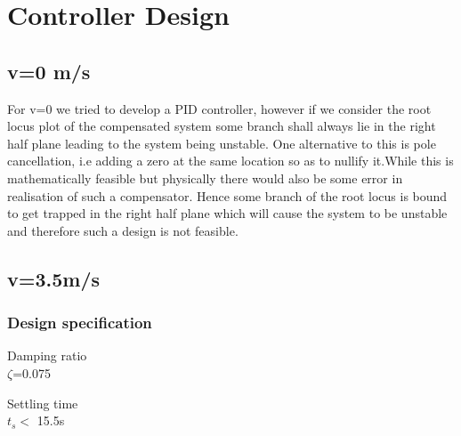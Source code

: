 \documentclass[notitlepage]{article}
\begin{document}
\newpage
\section{Controller Design}
\subsection{v=0 m/s}
\vspace{5mm}
\small For v=0 we tried to develop a PID controller, however if we consider the root locus plot of the compensated system some branch shall always lie in the right half plane leading to the system being unstable. One alternative to this is pole cancellation, i.e adding a zero at the same location so as to nullify it.While this is mathematically feasible but physically there would also be some error in realisation of such a compensator. Hence some branch of the root locus is bound to get trapped in the right half plane which will cause the system to be unstable and therefore such a design is not feasible.


\subsection{v=3.5m/s}
\vspace{5mm}
\subsubsection{Design specification}
\begin{center}
Damping ratio\\
$\zeta$=0.075
\end{center}
\begin{center}
Settling time\\
\small $t_s  <$ 15.5s
\end{center}

 
\end{document}

